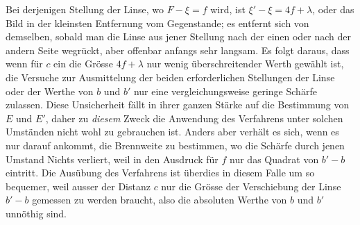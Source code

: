 Bei derjenigen Stellung der Linse, wo $F-\xi=f$ wird, ist $\xi'-\xi=4f+\lambda$, oder das Bild in der kleinsten Entfernung vom Gegenstande; es entfernt sich von demselben, sobald man die Linse aus jener Stellung nach der einen oder nach der andern Seite wegrückt, aber offenbar anfangs sehr langsam. Es folgt daraus, dass wenn für $c$ ein die Grösse $4f+\lambda$ nur wenig überschreitender Werth gewählt ist, die Versuche zur Ausmittelung der beiden erforderlichen Stellungen der Linse oder der Werthe von $b$ und $b'$ nur eine vergleichungsweise geringe Schärfe zulassen. Diese Unsicherheit fällt in ihrer ganzen Stärke auf die Bestimmung von $E$ und $E'$, daher zu \textit{diesem} Zweck die Anwendung des Verfahrens unter solchen Umständen nicht wohl zu gebrauchen ist. Anders aber verhält es sich, wenn es nur darauf ankommt, die Brennweite zu bestimmen, wo die Schärfe durch jenen Umstand Nichts verliert, weil in den Ausdruck für $f$ nur das Quadrat von $b'-b$ eintritt. Die Ausübung des Verfahrens ist überdies in diesem Falle um so bequemer, weil ausser der Distanz $c$ nur die Grösse der Verschiebung der Linse $b'-b$ gemessen zu werden braucht, also die absoluten Werthe von $b$ und $b'$ unnöthig sind.

